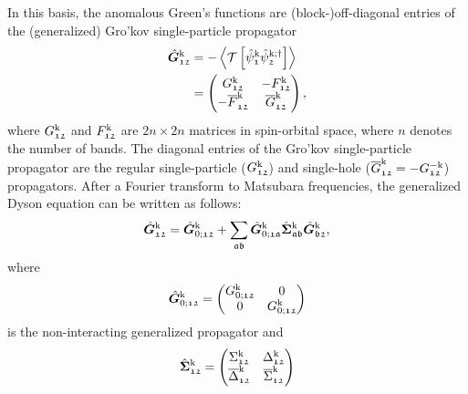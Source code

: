\documentclass[../../main.tex]{subfiles}
\begin{document}
In this basis, the anomalous Green's functions are (block-)off-diagonal entries of the (generalized) Gro'kov single-particle propagator
\begin{align}
\begin{split}
	\hat{\bm G}_{\mathfrak{12}}^{\text{k}}&=-\left\langle \mathcal{T}\left [\hat{\psi}_{\mathfrak{1}}^{\text{k}}\hat{\psi}_{\mathfrak{2}}^{\text{k};\dagger}\right ]\right\rangle\\
	&=\begin{pmatrix}
		G_{\mathfrak{12}}^{\text{k}} & -F_{\mathfrak{12}}^{\text{k}}	\\
		-\overline{F}_{\mathfrak{12}}^{\text{k}} & \overline{G}_{\mathfrak{12}}^{\text{k}}
	\end{pmatrix},
\end{split}
\end{align}
where $G_{\mathfrak{12}}^{\text{k}}$ and $F_{\mathfrak{12}}^{\text{k}}$ are $2n \times 2n$ matrices in spin-orbital space, where $n$ denotes the number of bands. The diagonal entries of the Gro'kov single-particle propagator are the regular single-particle ($ G_{\mathfrak{12}}^{\text{k}}$) and single-hole ($\overline{G}_{\mathfrak{12}}^{\text{k}}=-G_{\mathfrak{12}}^{-\text{k}}$) propagators. After a Fourier transform to Matsubara frequencies, the generalized Dyson equation can be written as follows:
\begin{align}
	\hat{\bm G}_{\mathfrak{12}}^{\text{k}} = \hat{\bm G}_{0;\mathfrak{12}}^{\text{k}} + \sum_{\mathfrak{ab}}\hat{\bm G}_{0;\mathfrak{1a}}^{\text{k}}\hat{\bm\Sigma}_{\mathfrak{ab}}^{\text{k}}\hat{\bm G}_{\mathfrak{b2}}^{\text{k}},
\end{align}
where
\begin{align}
	\hat{\bm G}_{0;\mathfrak{12}}^{\text{k}}=\begin{pmatrix}
		G_{0;\mathfrak{12}}^{\text{k}} & 0 \\ 0 & G_{0;\mathfrak{12}}^{\text{k}}
	\end{pmatrix}
\end{align}
is the non-interacting generalized propagator and
\begin{align}
	\hat{\bm\Sigma}_{\mathfrak{12}}^{\text{k}}=\begin{pmatrix}
		\Sigma_{\mathfrak{12}}^{\text{k}} & \Delta_{\mathfrak{12}}^{\text{k}} \\ 
		\overline{\Delta}_{\mathfrak{12}}^{\text{k}} & \overline{\Sigma}_{\mathfrak{12}}^{\text{k}}
	\end{pmatrix}
\end{align}
\end{document}
